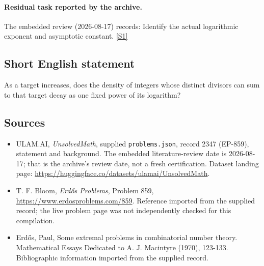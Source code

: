 \documentclass[11pt,a4paper]{article}
\newcommand{\sref}[2]{\hyperlink{source:#1:#2}{[S#2]}}
\begin{document}
\paragraph{Residual task reported by the archive.}

The embedded review (2026-08-17) records: Identify the actual logarithmic exponent and asymptotic constant. \sref{2347}{1}

\subsection{Short English statement}

As a target increases, does the density of integers whose distinct divisors can sum to that target decay as one fixed power of its logarithm?

\subsection{Sources}

{\small

\begin{itemize}

\item[\hypertarget{source:2347:1}{S1}] ULAM.AI, \emph{UnsolvedMath}, supplied \texttt{problems.json}, record 2347 (EP-859), statement and background. The embedded literature-review date is 2026-08-17; that is the archive’s review date, not a fresh certification. Dataset landing page: \url{https://huggingface.co/datasets/ulamai/UnsolvedMath}.

\item[\hypertarget{source:2347:2}{S2}] T. F. Bloom, \emph{Erdős Problems}, Problem 859, \url{https://www.erdosproblems.com/859}. Reference imported from the supplied record; the live problem page was not independently checked for this compilation.

\item[\hypertarget{source:2347:3}{S3}] Erd\H{o}s, Paul, Some extremal problems in combinatorial number theory. Mathematical Essays Dedicated to A. J. Macintyre (1970), 123-133. Bibliographic information imported from the supplied record.

\end{itemize}

}

\label{end:2347}
\end{document}
